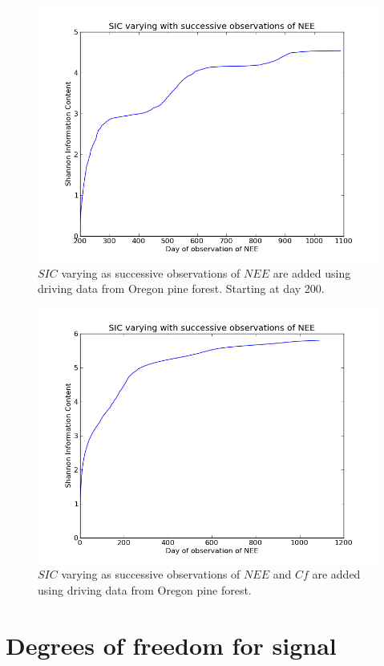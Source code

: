 \documentclass[11pt]{article}
\begin{document}
\begin{figure}[h]
\centering
\includegraphics[width=.9\textwidth]{SIC_200_1090.png}
\caption{$SIC$ varying as successive observations of $NEE$ are added using driving data from Oregon pine forest. Starting at day 200.}
\label{fig:SIC_subplot}
\end{figure}



\begin{figure}[h]
\centering
\includegraphics[width=.9\textwidth]{SIC_0_1090CfNEE.png}
\caption{$SIC$ varying as successive observations of $NEE$ and $Cf$ are added using driving data from Oregon pine forest.}
\label{fig:SIC_subplot}
\end{figure}

\section{Degrees of freedom for signal}
\end{document}
